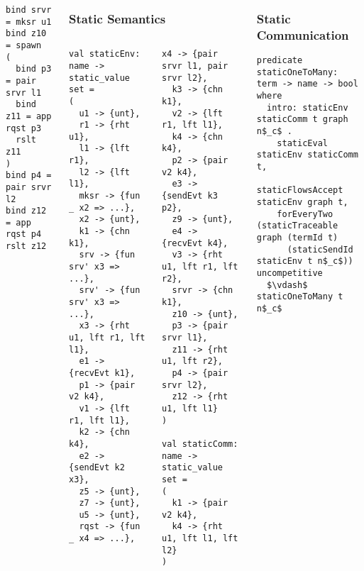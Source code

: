 \documentclass{beamer}
\begin{document}
\begin{frame}[fragile]
\begin{columns}
\begin{frame}[fragile]
\begin{columns}
\begin{column}{0.5\textwidth}
\begin{lstlisting}[language=normal_lang, mathescape]
bind srvr = mksr u1
bind z10 = spawn
( 
  bind p3 = pair srvr l1
  bind z11 = app rqst p3
  rslt z11
)
bind p4 = pair srvr l2
bind z12 = app rqst p4
rslt z12
\end{lstlisting}
\end{column}
\end{columns}
\end{frame}



\begin{frame}[fragile]
	\frametitle{Static Semantics}
\begin{columns}
\begin{column}{0.5\textwidth}
\begin{lstlisting}[language=sugar_lang, mathescape]
val staticEnv: name -> static_value set =
(
  u1 -> {unt},
  r1 -> {rht u1},
  l1 -> {lft r1},
  l2 -> {lft l1},
  mksr -> {fun  _ x2 => ...},
  x2 -> {unt},
  k1 -> {chn k1},
  srv -> {fun srv' x3 => ...},
  srv' -> {fun srv' x3 => ...},
  x3 -> {rht u1, lft r1, lft l1},
  e1 -> {recvEvt k1},
  p1 -> {pair v2 k4},
  v1 -> {lft r1, lft l1},
  k2 -> {chn k4},
  e2 -> {sendEvt k2 x3},
  z5 -> {unt},
  z7 -> {unt},
  u5 -> {unt},
  rqst -> {fun _ x4 => ...},
\end{lstlisting}
\end{column}

\begin{column}{0.5\textwidth}
\begin{lstlisting}[language=sugar_lang, mathescape]
  x4 -> {pair srvr l1, pair srvr l2},
  k3 -> {chn k1},
  v2 -> {lft r1, lft l1},
  k4 -> {chn k4},
  p2 -> {pair v2 k4},
  e3 -> {sendEvt k3 p2},
  z9 -> {unt},
  e4 -> {recvEvt k4},
  v3 -> {rht u1, lft r1, lft r2},
  srvr -> {chn k1},
  z10 -> {unt},
  p3 -> {pair srvr l1},
  z11 -> {rht u1, lft r2},
  p4 -> {pair srvr l2},
  z12 -> {rht u1, lft l1}
)

val staticComm: name -> static_value set =
(
  k1 -> {pair v2 k4},
  k4 -> {rht u1, lft l1, lft l2}
)
\end{lstlisting}
\end{column}
\end{columns}
\end{frame}

\begin{frame}[fragile]
	\frametitle{Static Communication}
\begin{lstlisting}[language=logic, mathescape]
predicate staticOneToMany: term -> name -> bool where
  intro: staticEnv staticComm t graph n$_c$ .
    staticEval staticEnv staticComm t,
    staticFlowsAccept staticEnv graph t,
    forEveryTwo (staticTraceable graph (termId t)
      (staticSendId staticEnv t n$_c$)) uncompetitive
  $\vdash$ staticOneToMany t n$_c$


\end{lstlisting}
\end{frame}
\end{columns}
\end{frame}
\end{document}
